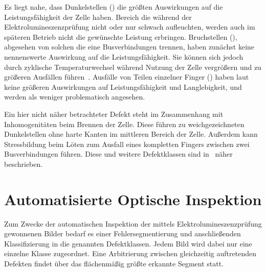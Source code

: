 Es liegt nahe, dass Dunkelstellen () die größten Auswirkungen auf die Leistungsfähigkeit der Zelle haben. Bereich die während der Elektrolumineszenzprüfung nicht oder nur schwach aufleuchten, werden auch im späteren Betrieb nicht die gewünschte Leistung erbringen. Bruchstellen (), abgesehen von solchen die eine Busverbindungen trennen, haben zunächst keine nennenswerte Auswirkung auf die Leistungsfähigkeit. Sie können sich jedoch durch zyklische Temperaturwechsel während Nutzung der Zelle vergrößern und zu größeren Ausfällen führen~\cite{Deitsch2018}. Ausfälle von Teilen einzelner Finger () haben laut~\cite{Köntges2014} keine größeren Auswirkungen auf Leistungsfähigkeit und Langlebigkeit, und werden als weniger problematisch angesehen.

Ein hier nicht näher betrachteter Defekt steht im Zusammenhang mit Inhomogenitäten beim Brennen der Zelle. Diese führen zu weichgezeichneten Dunkelstellen ohne harte Kanten im mittleren Bereich der Zelle. Außerdem kann Stressbildung beim Löten zum Ausfall eines kompletten Fingers zwischen zwei Busverbindungen führen. Diese und weitere Defektklassen sind in~\cite{Köntges2014} näher beschrieben.

\section{Automatisierte Optische Inspektion}

Zum Zwecke der automatischen Inspektion der mittels Elektrolumineszenzprüfung gewonnenen Bilder bedarf es einer Fehlersegmentierung und anschließenden Klassifizierung in die genannten Defektklassen. Jedem Bild wird dabei nur eine einzelne Klasse zugeordnet. Eine Arbitrierung zwischen gleichzeitig auftretenden Defekten findet über das flächenmäßig größte erkannte Segment statt.

